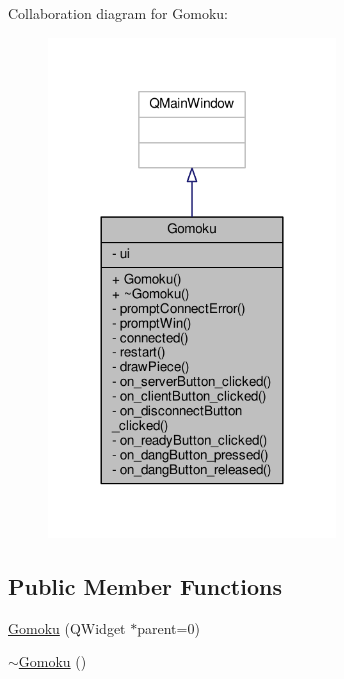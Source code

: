 Collaboration diagram for Gomoku\+:
\nopagebreak
\begin{figure}[H]
\begin{center}
\leavevmode
\includegraphics[width=216pt]{classGomoku__coll__graph}
\end{center}
\end{figure}
\subsection*{Public Member Functions}
\begin{DoxyCompactItemize}
\item 
\hyperlink{classGomoku_a15ad6f6d31efe9e4828ba79985d8880d}{Gomoku} (Q\+Widget $\ast$parent=0)
\item 
\hyperlink{classGomoku_a13a08a648094406111ba1b8b76047e37}{$\sim$\+Gomoku} ()
\end{DoxyCompactItemize}
